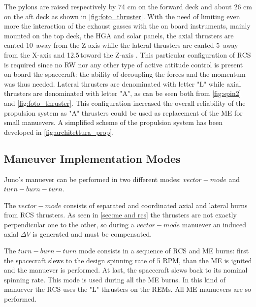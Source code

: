 

The pylons are raised respectively by 74 cm on the forward deck and about 26 cm on the aft deck as shown in \autoref{fig:foto_thruster}.
 With the need of limiting even more the interaction of the exhaust gasses with the on board instruments, mainly mounted on the top deck, the HGA and solar panels, the axial thrusters are canted 10\textdegree\, away from the Z-axis while the lateral thrusters are canted 5\textdegree\, away from the X-axis and 12.5\textdegree \,toward the Z-axis \cite{junno_inner}. This particular configuration of RCS is required since no RW nor any other type of active attitude control is present on board the spacecraft: the ability of decoupling the forces and the momentum was thus needed.
Lateral thrusters are denominated with letter "L" while axial thrusters are denominated with letter "A", as can be seen both from \autoref{fig:spin2} and \autoref{fig:foto_thruster}. This configuration increased the overall reliability of the propulsion system as "A" thrusters could be used as replacement of the ME for small manuevers. A simplified scheme of the propulsion system has been developed in \autoref{fig:architettura_prop}.


\subsection{Maneuver Implementation Modes}
\label{sec: manuever implemementation modes}

Juno's manuever can be performed in two different modes: $vector-mode$ and $turn-burn-turn$. 

The $vector-mode$ consists of separated and coordinated axial and lateral burns from RCS thrusters. As seen in \autoref{sec:me and rcs} the thrusters are not exactly perpendicular one to the other, so during a $vector-mode$ manuever an induced axial $\Delta V$ is generated and must be compensated.


The $turn-burn-turn$ mode consists in a sequence of RCS and ME burns: first the spacecraft slews to the design spinning rate of 5 RPM, than the ME is ignited and the manuever is performed. At last, the spacecraft slews back to its nominal spinning rate. This mode is used during all the ME burns. In this kind of manuever the RCS uses the "L" thrusters on the REMs. All ME manuevers are so performed. 

